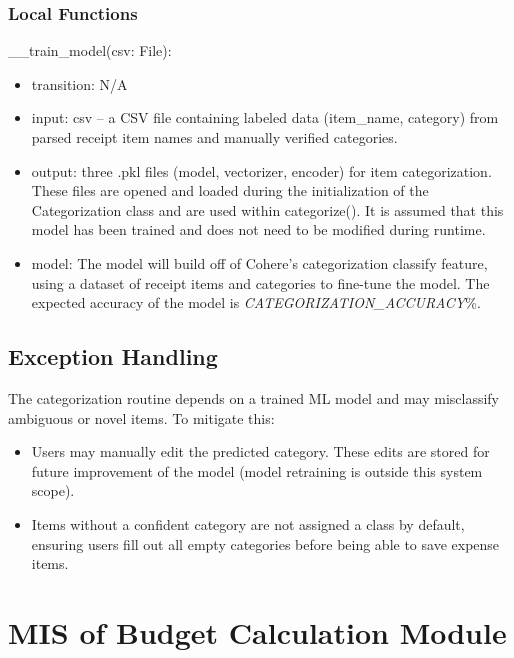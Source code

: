 \documentclass[12pt, titlepage]{article}
\begin{document}
\subsubsection{Local Functions}
\noindent \_\_train\_model(csv: File):
\begin{itemize}
  \item transition: N/A
  \item input: csv -- a CSV file containing labeled data (item\_name, category)
  from parsed receipt item names and manually verified categories.
  \item output: three .pkl files (model, vectorizer, encoder) for item
  categorization. These files are opened and loaded during the initialization of
  the Categorization class and are used within categorize(). It is assumed that
  this model has been trained and does not need to be modified during runtime.
  \item model: The model will build off of Cohere's categorization classify
  feature, using a dataset of receipt items and categories to fine-tune the
  model. The expected accuracy of the model is
  \textit{CATEGORIZATION\_ACCURACY}\%.
\end{itemize}

\subsection{Exception Handling}

The categorization routine depends on a trained ML model and may misclassify ambiguous or novel items. To mitigate this:

\begin{itemize}
    \item Users may manually edit the predicted category. These edits are stored for future improvement of the model (model retraining is outside this system scope).
    \item Items without a confident category are not assigned a class by default, ensuring users fill out all empty categories before being able to save expense items.
\end{itemize}

\newpage



\section{MIS of Budget Calculation Module}\label{budget_calculation_module}
\end{document}
